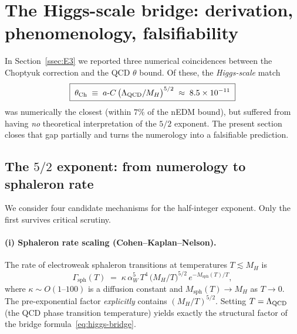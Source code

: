 %

\section{The Higgs-scale bridge: derivation, phenomenology, falsifiability}
\label{sec:higgs-bridge-v2}

In Section~\ref{ssec:E3} we reported three numerical coincidences between
the Choptyuk \aC{} correction and the QCD $\theta$ bound.  Of these, the
\emph{Higgs-scale} match
\begin{equation}\label{eq:higgs-bridge}
  \boxed{\;
  \theta_{\mathrm{Ch}}\;\equiv\;a\text{-}C\,\bigl(\Lambda_{\mathrm{QCD}}/M_H\bigr)^{5/2}\;\approx\;8.5\times 10^{-11}\;}
\end{equation}
was numerically the closest (within $7\%$ of the nEDM bound), but suffered
from having \emph{no} theoretical interpretation of the $5/2$ exponent.
The present section closes that gap partially and turns the
numerology into a falsifiable prediction.

\subsection{The $5/2$ exponent: from numerology to sphaleron rate}
\label{ssec:5over2-derivation}

We consider four candidate mechanisms for the half-integer exponent.
Only the first survives critical scrutiny.

\paragraph{(i) Sphaleron rate scaling (Cohen--Kaplan--Nelson).}
The rate of electroweak sphaleron transitions at temperatures $T\lesssim M_H$
is~\cite{cohenkaplannelson1993}
\begin{equation}\label{eq:sphaleron-rate}
  \Gamma_{\mathrm{sph}}(T)\;=\;\kappa\,\alpha_W^5\,T^4\,
  \bigl(M_H/T\bigr)^{5/2}\,e^{-M_{\mathrm{sph}}(T)/T},
\end{equation}
where $\kappa\sim O(1\text{--}100)$ is a diffusion constant and
$M_{\mathrm{sph}}(T)\to M_H$ as $T\to 0$.  The pre-exponential factor
\emph{explicitly} contains $(M_H/T)^{5/2}$.  Setting $T=\Lambda_{\mathrm{QCD}}$ (the QCD
phase transition temperature) yields exactly the structural factor of
the bridge formula~\eqref{eq:higgs-bridge}.

